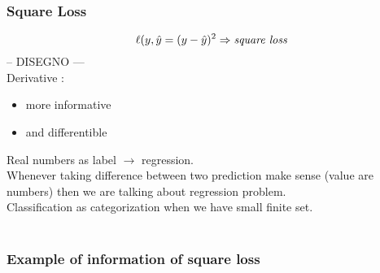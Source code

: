 \documentclass[../main.tex]{subfiles}
\begin{document}
\subsubsection{Square Loss}
$$ \ell(y,\hat{y} = ( y - \hat{y} )^2  \Rightarrow \textit{square loss}\\$$
-- DISEGNO ---\\
Derivative :
\begin{itemize}
\item more informative
\item and differentible 
\end{itemize}
Real numbers as label $\rightarrow$ regression.\\
Whenever taking difference between two prediction make sense (value are numbers) then we are talking about regression problem.\\
Classification as categorization when we have small finite set.\\\\

\subsubsection{Example of information of square loss}
\end{document}
